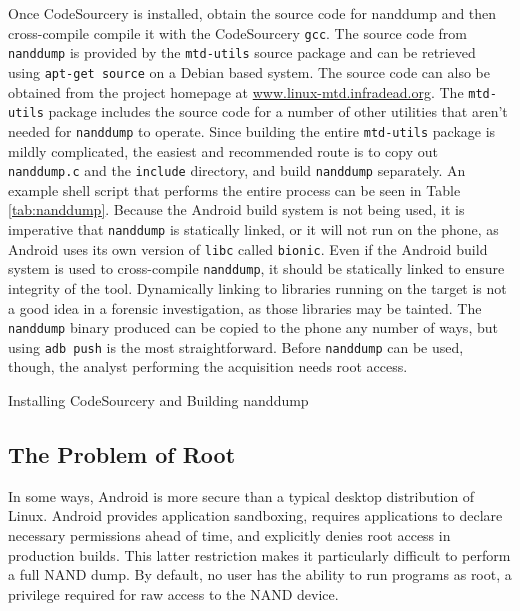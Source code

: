 Once CodeSourcery is installed, obtain the source code for nanddump and then cross-compile compile it with the CodeSourcery
\texttt{gcc}.  The source code from \texttt{nanddump} is provided by the \texttt{mtd-utils} source package and can be retrieved
using \texttt{apt-get source} on a Debian based system.  The source code can also be obtained from the project homepage at
\url{www.linux-mtd.infradead.org}.  The \texttt{mtd-utils} package includes the source code for a number of other utilities that
aren't needed for \texttt{nanddump} to operate.  Since building the entire \texttt{mtd-utils} package is mildly complicated, the
easiest and recommended route is to copy out \texttt{nanddump.c} and the \texttt{include} directory, and build \texttt{nanddump}
separately.  An example shell script that performs the entire process can be seen in Table \ref{tab:nanddump}.  Because the Android
build system is not being used, it is imperative that \texttt{nanddump} is statically linked, or it will not run on the phone, as
Android uses its own version of \texttt{libc} called \texttt{bionic}.  Even if the Android build system is used to cross-compile
\texttt{nanddump}, it should be statically linked to ensure integrity of the tool.  Dynamically linking to libraries running on the
target is not a good idea in a forensic investigation, as those libraries may be tainted.  The \texttt{nanddump} binary produced can
be copied to the phone any number of ways, but using \texttt{adb push} is the most straightforward.  Before \texttt{nanddump} can be
used, though, the analyst performing the acquisition needs root access.

\begin{table}[htpb]

\caption{Installing CodeSourcery and Building nanddump}
\label{tab:nanddump}
\end{table}

\subsection{The Problem of Root}
In some ways, Android is more secure than a typical desktop distribution of Linux.  Android provides application sandboxing,
requires applications to declare necessary permissions ahead of time, and explicitly denies root access in production builds. This
latter restriction makes it particularly difficult to perform a full NAND dump.  By default, no user has the ability to run programs
as root, a privilege required for raw access to the NAND device.  


